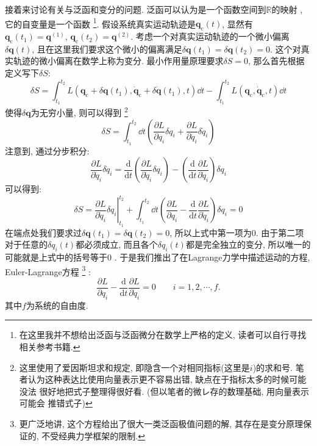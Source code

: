        接着来讨论有关与泛函和变分的问题. 泛函可以认为是一个函数空间到$\mathbb{R}$的映射
        , 它的自变量是一个函数
        \footnote{
            在这里我并不想给出泛函与泛函微分在数学上严格的定义, 
            读者可以自行寻找相关参考书籍.
            }. 
        假设系统真实运动轨迹是$\bm q_\mathrm{c}(t)$, 显然有
        $\bm q_\mathrm{c}(t_1) = \bm q^{(1)}$, $\bm q_\mathrm{c}(t_2) =\bm q^{(2)}$. 
        考虑一个对真实运动轨迹的一个微小偏离$\delta \bm q(t)$, 
        且在这里我们要求这个微小的偏离满足$\delta \bm q(t_1)=\delta \bm q(t_2)=0$. 
        这个对真实轨迹的微小偏离在数学上称为变分.
        最小作用量原理要求$\delta S = 0$, 那么首先根据定义写下$\delta S$: 
        \begin{equation}
            \delta S = \int_{t_1}^{t_2} L( \bm q_\mathrm{c} + \delta \bm q(t_1) , \dot{\bm q}_\mathrm{c} + \delta \dot{\bm q}(t_1), t ) \dd t - \int_{t_1}^{t_2} L( \bm q_\mathrm{c} , \dot{\bm q}_\mathrm{c}, t ) \dd t
        \end{equation}
        使得$\delta \bm q$为无穷小量, 则可以得到
        \footnote{
            这里使用了爱因斯坦求和规定, 即隐含一个对相同指标(这里是$i$)的求和号. 
            笔者认为这种表达比使用向量表示更不容易出错, 缺点在于指标太多的时候可能没法
            很好地把式子整理得很好看. (但以笔者的微レ存的数理基础, 用向量表示可能会
            推错式子)
            }
        \begin{equation}
            \delta S = \int_{t_1}^{t_2} \dd t \left( \frac{\partial L}{\partial q_i} \delta q_i + \frac{\partial L}{\partial \dot q_i} \delta \dot q_i \right)
        \end{equation}
        注意到, 通过分步积分:
        \begin{equation}
            \frac{\partial L}{\partial \dot q_i} \delta \dot q_i = \frac{\mathrm{d}}{\mathrm{d} t} \left( \frac{\partial L}{\partial \dot q_i} \delta q_i \right) - \left(\frac{\mathrm{d} }{\mathrm{d} t} \frac{\partial L}{\partial \dot q_i} \right) \delta q_i
        \end{equation}
        可以得到:
        \begin{equation}\label{eq:8-1-1}
            \delta S = \left. \frac{\partial L}{\partial \dot q_i} \delta q_i \right|_{t_1}^{t_2} + \int_{t_1}^{t_2} \dd t \left( \frac{\partial L}{\partial q_i} - \frac{\mathrm{d} }{\mathrm{d} t} \frac{\partial L}{\partial \dot q_i} \right) \delta q_i = 0
        \end{equation}
        在端点处我们要求过$\delta \bm q(t_1)=\delta \bm q(t_2)=0$, 
        所以上式中第一项为0. 由于第二项对于任意的$\delta q_i(t)$都必须成立, 
        而且各个$\delta q_i(t)$都是完全独立的变分, 所以唯一的可能就是上式中的括号等于0
        . 于是我们推出了在Lagrange力学中描述运动的方程, Euler-Lagrange方程
        \footnote{
            更广泛地讲, 这个方程给出了很大一类泛函极值问题的解, 其存在是变分原理保证的, 
            不受经典力学框架的限制. 
        }
        :
        \begin{equation}
            \frac{\partial L}{\partial q_i} - \frac{\mathrm{d} }{\mathrm{d} t} \frac{\partial L}{\partial \dot q_i} = 0
            \qquad i = 1,2,\cdots,f.
        \end{equation}
        其中$f$为系统的自由度. 

